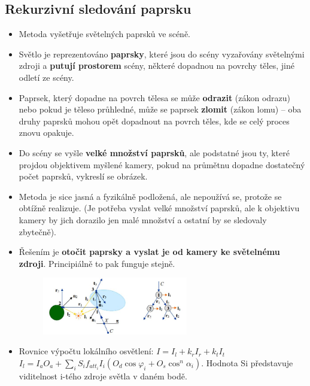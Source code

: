 \subsection{Rekurzivní sledování paprsku}
\begin{itemize}
 \item Metoda vyšetřuje  světelných paprsků ve scéně.
 \item Světlo je reprezentováno \textbf{paprsky}, které jsou do scény vyzařovány světelnými zdroji a \textbf{putují prostorem} scény, některé dopadnou na povrchy těles, jiné odletí ze scény.
 \item Paprsek, který dopadne na povrch tělesa se může \textbf{odrazit} (zákon odrazu) nebo pokud je těleso průhledné, může se paprsek \textbf{zlomit} (zákon lomu) -- oba druhy paprsků mohou opět dopadnout na povrch těles, kde se celý proces znovu opakuje. %
 \item Do scény se vyšle \textbf{velké množství paprsků}, ale podstatné jsou ty, které projdou objektivem myšlené kamery, pokud na průmětnu dopadne dostatečný počet paprsků, vykreslí se obrázek.
\item Metoda je sice jasná a fyzikálně podložená, ale nepoužívá se, protože se obtížně realizuje. (Je potřeba vyslat velké množství paprsků, ale k objektivu kamery by jich dorazilo jen malé množství a ostatní by se sledovaly zbytečně). 
\item Řešením je \textbf{otočit paprsky a vyslat je od kamery ke světelnému zdroji}. Principiálně to pak funguje stejně.
 \begin{figure}[H]
		\centering
		\includegraphics[width=0.6\textwidth]{assets/6_rekurzivni_sledovani_paprsku}
\end{figure}
 \item Rovnice výpočtu lokálního osvětlení: $I = I_l + k_rI_r + k_tI_t$ \\
  $I_l = I_aO_a + \sum\limits_{i} S_if_{att_i}I_i(O_d \cos{\varphi_i} + O_s \cos^n{\alpha_i} )$.
	Hodnota Si představuje viditelnost i-tého zdroje světla v daném bodě.
\end{itemize}
